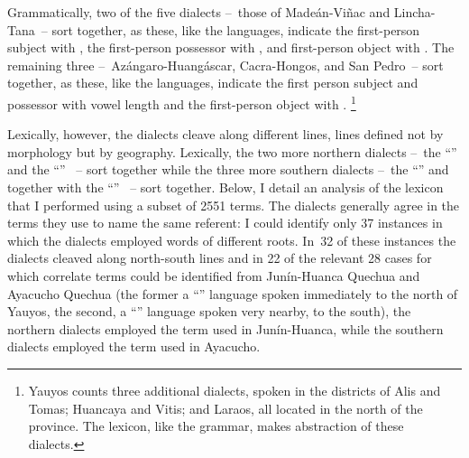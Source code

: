 Grammatically, two of the five dialects --~those of Madeán-Viñac and Lincha-Tana~-- sort together, as these, like the \QII{} languages, indicate the first-person subject with , the first-person possessor with , and first-person object with . The remaining three --~Azángaro-Huangáscar, Cacra-Hongos, and San Pedro~-- sort together, as these, like the \QI{} languages, indicate the first person subject and possessor with vowel length and the first-person object with .%
\footnote{Yauyos counts three additional dialects, spoken in the districts of Alis and Tomas; Huancaya and Vitis; and Laraos, all located in the north of the province. The lexicon, like the grammar, makes abstraction of these dialects.}

Lexically, however, the dialects cleave along different lines, lines defined not by morphology but by geography. Lexically, the two more northern dialects --~the “\QI” \CH{} and the “\QII” \LT~-- sort together while the three more southern dialects --~the “\QI” \AH{} and \SP{} together with the “\QII” \MV~-- sort together. Below, I detail an analysis of the lexicon that I performed using a subset of 2551 terms. The dialects generally agree in the terms they use to name the same referent: I could identify only 37 instances in which the dialects employed words of different roots. In~32 of these instances the dialects cleaved along north-south lines and in 22 of the relevant 28 cases for which correlate terms could be identified from Junín-Huanca Quechua and Ayacucho Quechua (the former a “\QI” language spoken immediately to the north of Yauyos, the second, a “\QII” language spoken very nearby, to the south), the northern dialects employed the term used in Junín-Huanca, while the southern dialects employed the term used in Ayacucho.%
